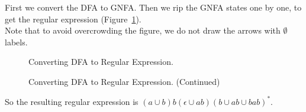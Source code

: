 \documentclass{article}
\numberwithin{equation}{subsection}
\begin{document}
\subsubsection{}
First we convert the DFA to GNFA.
Then we rip the GNFA states one by one, to get the regular expression (Figure~\ref{fig:automata3-2-1}).\\
Note that to avoid overcrowding the figure, we do not draw the arrows with \(\emptyset\) labels.
\begin{figure}
\centering  
\begin{subfigure}[b]{\textwidth}
\centering

\end{subfigure}

\medskip
\begin{subfigure}[b]{\textwidth}
\centering

\end{subfigure}

\medskip
\begin{subfigure}[b]{\textwidth}
\centering

\end{subfigure}

\medskip
\begin{subfigure}[b]{\textwidth}
\centering

\end{subfigure}

\medskip
\caption{Converting DFA to Regular Expression.}
\label{fig:automata3-2-1}
\end{figure}%
\begin{figure}[t]\ContinuedFloat
\centering  
\begin{subfigure}[t]{\textwidth}
\centering

\end{subfigure}

\medskip
\begin{subfigure}[t]{\textwidth}
\centering

\end{subfigure}

\medskip
\caption{Converting DFA to Regular Expression. (Continued)}
\end{figure}

\pagebreak
So the resulting regular expression is \((a\cup b)b(\epsilon\cup ab)(b\cup ab \cup bab)^*\).
\end{document}
